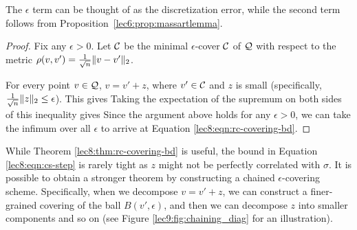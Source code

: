 The $\epsilon$ term can be thought of as the discretization error, while the second term follows from Proposition~\ref{lec6:prop:massartlemma}.

\begin{proof}
Fix any $\epsilon > 0$. Let $\mathcal C$ be the minimal $\epsilon$-cover $\mathcal C$ of $\mathcal Q$ with respect to the metric $\rho(v,v') = \frac 1 {\sqrt{n}} \|v-v'\|_2$. 

For every point $v\in \mathcal Q$, $v=v'+z$, where $v'\in \mathcal C$ and $z$ is small (specifically, $\frac 1 {\sqrt{n}} \|z\|_2 \le \epsilon$). This gives
Taking the expectation of the supremum on both sides of this inequality gives
Since the argument above holds for any $\epsilon > 0$, we can take the infimum over all $\epsilon$ to arrive at Equation \eqref{lec8:eqn:rc-covering-bd}.

\end{proof}


While Theorem \ref{lec8:thm:rc-covering-bd} is useful, the bound in Equation \eqref{lec8:eqn:cs-step} is rarely tight as $z$ might not be perfectly correlated with $\sigma$. It is possible to obtain a stronger theorem by constructing a chained $\epsilon$-covering scheme. Specifically, when we decompose $v=v'+z$, we can construct a finer-grained covering of the ball $B(v',\epsilon)$, and then we can decompose $z$ into smaller components and so on (see Figure \ref{lec9:fig:chaining_diag} for an illustration).

